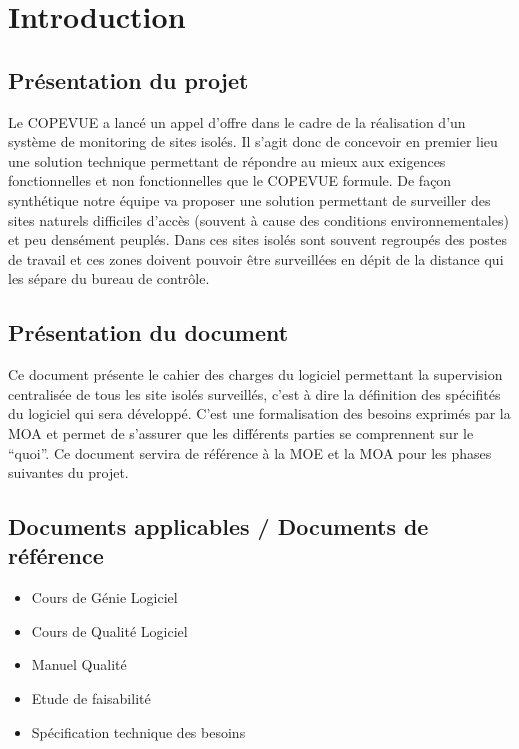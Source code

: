 \section{Introduction}

\subsection{Présentation du projet}

Le COPEVUE a lancé un appel d'offre dans le cadre de la réalisation d'un système de monitoring de sites isolés. Il s'agit donc de concevoir en premier lieu une solution technique permettant de répondre au mieux aux exigences fonctionnelles et non fonctionnelles que le COPEVUE formule. De façon synthétique notre équipe va proposer une solution permettant de surveiller des sites naturels difficiles d'accès (souvent à cause des conditions environnementales) et peu densément peuplés. Dans ces sites isolés sont souvent regroupés des postes de travail et ces zones doivent pouvoir être surveillées en dépit de la distance qui les sépare du bureau de contrôle.

\subsection{Présentation du document}
Ce document présente le cahier des charges du logiciel permettant la supervision centralisée de tous les site isolés surveillés, c'est à dire la définition des spécifités du logiciel qui sera développé. C'est une formalisation des besoins exprimés par la MOA et permet de s'assurer que les différents parties se comprennent sur le ``quoi''. Ce document servira de référence à la MOE et la MOA pour les phases suivantes du projet.

\subsection{Documents applicables / Documents de référence}

\begin{itemize}
	\item Cours de Génie Logiciel
	\item Cours de Qualité Logiciel
	\item Manuel Qualité 
	\item Etude de faisabilité
	\item Spécification technique des besoins
\end{itemize}

